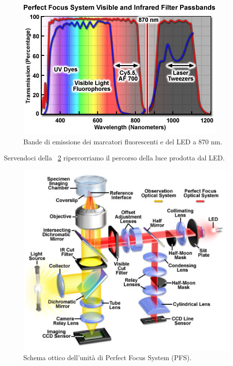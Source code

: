 \begin{itemize}
\begin{figure}[!ht]
 \centering
 \includegraphics[scale=.60]{img/CAP2bande.png}
 \caption{\small{Bande di emissione dei marcatori fluorescenti e del LED a 870 nm.}}
 \label{fig:bande}
\end{figure}

Servendoci della \figurename~\ref{fig:PFSschema} ripercorriamo il percorso della luce prodotta dal LED. 

\begin{figure}[!ht]
 \centering
 \includegraphics[scale=.60]{img/CAP2PFSschema.png}
 \caption{\small{Schema ottico dell'unità di Perfect Focus System (PFS).}}
 \label{fig:PFSschema}
\end{figure}


\end{itemize}
